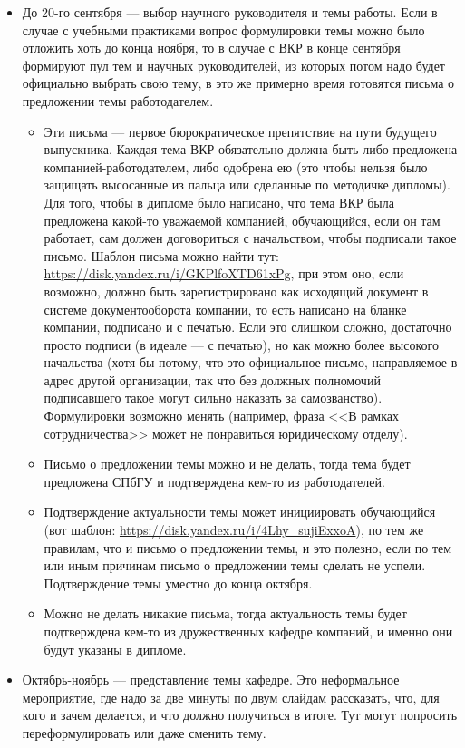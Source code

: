 \documentclass{article}
\begin{document}
\begin{itemize}
    \item До 20-го сентября --- выбор научного руководителя и темы работы. Если в случае с учебными практиками вопрос формулировки темы можно было отложить хоть до конца ноября, то в случае с ВКР в конце сентября формируют пул тем и научных руководителей, из которых потом надо будет официально выбрать свою тему, в это же примерно время готовятся письма о предложении темы работодателем.
    \begin{itemize}
        \item Эти письма --- первое бюрократическое препятствие на пути будущего выпускника. Каждая тема ВКР обязательно должна быть либо предложена компанией-работодателем, либо одобрена ею (это чтобы нельзя было защищать высосанные из пальца или сделанные по методичке дипломы). Для того, чтобы в дипломе было написано, что тема ВКР была предложена какой-то уважаемой компанией, обучающийся, если он там работает, сам должен договориться с начальством, чтобы подписали такое письмо. Шаблон письма можно найти тут: \url{https://disk.yandex.ru/i/GKPlfoXTD61xPg}, при этом оно, если возможно, должно быть зарегистрировано как исходящий документ в системе документооборота компании, то есть написано на бланке компании, подписано и с печатью. Если это слишком сложно, достаточно просто подписи (в идеале --- с печатью), но как можно более высокого начальства (хотя бы потому, что это официальное письмо, направляемое в адрес другой организации, так что без должных полномочий подписавшего такое могут сильно наказать за самозванство). Формулировки возможно менять (например, фраза <<В рамках сотрудничества>> может не понравиться юридическому отделу).
        \item Письмо о предложении темы можно и не делать, тогда тема будет предложена СПбГУ и подтверждена кем-то из работодателей.
        \item Подтверждение актуальности темы может инициировать обучающийся (вот шаблон: \url{https://disk.yandex.ru/i/4Lhy_sujiExxoA}), по тем же правилам, что и письмо о предложении темы, и это полезно, если по тем или иным причинам письмо о предложении темы сделать не успели. Подтверждение темы уместно до конца октября.
        \item Можно не делать никакие письма, тогда актуальность темы будет подтверждена кем-то из дружественных кафедре компаний, и именно они будут указаны в дипломе.
    \end{itemize}
    \item Октябрь-ноябрь --- представление темы кафедре. Это неформальное мероприятие, где надо за две минуты по двум слайдам рассказать, что, для кого и зачем делается, и что должно получиться в итоге. Тут могут попросить переформулировать или даже сменить тему.

\end{itemize}
\end{document}
